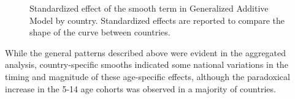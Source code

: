 \documentclass[Harvard,Times1COL]{WileyNJDv5}
\begin{document}
{\begin{figure}[h]


\caption{\label{fig-country}Standardized effect of the smooth term in
Generalized Additive Model by country. Standardized effects are reported
to compare the shape of the curve between countries.}

\end{figure}%

While the general patterns described above were evident in the
aggregated analysis, country-specific smooths indicated some national
variations in the timing and magnitude of these age-specific effects,
although the paradoxical increase in the 5-14 age cohorts was observed
in a majority of countries.

\begin{figure}[h]

\centering{

}
\end{figure}}
\end{document}
